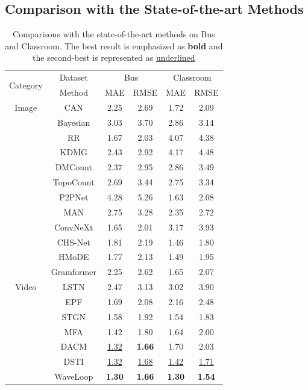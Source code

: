 \documentclass[lettersize,journal]{IEEEtran}
\begin{document}
\subsection{Comparison with the State-of-the-art Methods}

\begin{table}[h]
\caption{Comparisons with the state-of-the-art methods on Bus and Classroom. The best result is emphasized as \textbf{bold} and the second-best is represented as \underline{underlined}}
\centering
\scriptsize
\begin{tabular}{cccccc}
    \toprule
    \multirow{2}{*}{Category}&Dataset&\multicolumn{2}{c}{Bus}&\multicolumn{2}{c}{Classroom}\\
    &Method &MAE & RMSE&MAE & RMSE\\
    \midrule
   Image & CAN \cite{liu2019context} & 2.25 & 2.69 & 1.72 & 2.09 \\
   & Bayesian \cite{ma2019bayesian} &3.03 & 3.70 & 2.86 & 3.14 \\
   & RR \cite{wan2019residual} &  1.67 & 2.03 & 4.07 & 4.38 \\
   & KDMG \cite{wan2020kernel} &  2.43 & 2.92 & 4.17 & 4.48 \\
   & DMCount \cite{wang2020distribution} & 2.37 & 2.95 & 2.86 & 3.49 \\
   & TopoCount \cite{abousamra2021localization}  & 2.69 & 3.44 & 2.75 & 3.34 \\
   & P2PNet \cite{song2021rethinking}  & 4.28 & 5.26 & 1.63 & 2.08 \\ 
   & MAN \cite{lin2022boosting} & 2.75 & 3.28 & 2.35 & 2.72 \\ 
   & ConvNeXt \cite{liu2022convnet}  & 1.65 & 2.01 & 3.17 & 3.93 \\
   & CHS-Net \cite{dai2023cross} & 1.81 & 2.19 & 1.46 & 1.80 \\
   & HMoDE \cite{du2023redesigning} & 1.77 & 2.13 & 1.49 & 1.95 \\  
   & Gramformer \cite{lin2024gramformer}  & 2.25 & 2.62 & 1.65 & 2.07 \\  
   \midrule
   Video & LSTN \cite{fang2019locality} &  2.47 & 3.13 & 3.02 & 3.90 \\
   & EPF \cite{liu2020estimating} & 1.69 & 2.08 & 2.16 & 2.48 \\
   & STGN \cite{wu2022spatial} & 1.58 & 1.92 & 1.54 & 1.83 \\
   & MFA \cite{ling2023motional} & 1.42 & 1.80 & 1.64 & 2.00 \\ 
   & DACM \cite{ling2025dual} & \underline{1.32} & \textbf{1.66} & 1.70 & 2.03 \\ 
   & DSTI \cite{ling2026dual} & \underline{1.32} & \underline{1.68} & \underline{1.42} & \underline{1.71}  \\
   & WaveLoop  & \textbf{1.30} & \textbf{1.66} & \textbf{1.30} & \textbf{1.54} \\
    \bottomrule
\end{tabular}
\label{tab:1}
 \vspace{-1em}
\end{table}
\end{document}
